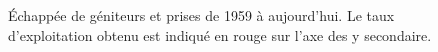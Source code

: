 \documentclass[french,11pt]{book}
\begin{document}
\begin{figure}[htb]

{\centering {} 

}

\caption{Échappée de géniteurs et prises de 1959 à aujourd'hui. Le taux d'exploitation obtenu est indiqué en rouge sur l'axe des y secondaire.}\label{fig:fig-catch-esc}
\end{figure}
\end{document}
